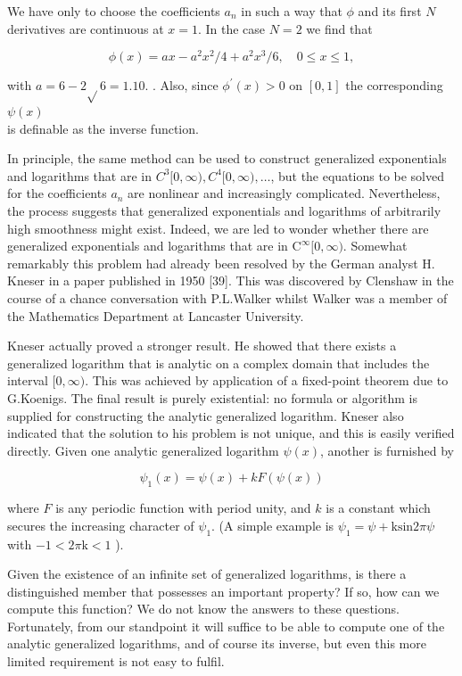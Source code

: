 \documentclass[10pt]{article}
\begin{document}
We have only to choose the coefficients $a_{n}$ in such a way that $\phi$ and its first $N$ derivatives are continuous at $x=1$. In the case $N=2$ we find that

$$
\phi(x)=a x-a^{2} x^{2} / 4+a^{2} x^{3} / 6, \quad 0 \leqslant x \leqslant 1,
$$

with $a=6-2 \sqrt{ } 6=1.10$. . Also, since $\phi^{\prime}(x)>0$ on $[0,1]$ the corresponding $\psi(x)$\\
is definable as the inverse function.

In principle, the same method can be used to construct generalized exponentials and logarithms that are in $C^{3}[0, \infty), C^{4}[0, \infty), \ldots$, but the equations to be solved for the coefficients $a_{n}$ are nonlinear and increasingly complicated. Nevertheless, the process suggests that generalized exponentials and logarithms of arbitrarily high smoothness might exist. Indeed, we are led to wonder whether there are generalized exponentials and logarithms that are in $\mathrm{C}^{\infty}[0, \infty)$. Somewhat remarkably this problem had already been resolved by the German analyst H. Kneser in a paper published in 1950 [39]. This was discovered by Clenshaw in the course of a chance conversation with P.L.Walker whilst Walker was a member of the Mathematics Department at Lancaster University.

Kneser actually proved a stronger result. He showed that there exists a generalized logarithm that is analytic on a complex domain that includes the interval $[0, \infty)$. This was achieved by application of a fixed-point theorem due to G.Koenigs. The final result is purely existential: no formula or algorithm is supplied for constructing the analytic generalized logarithm. Kneser also indicated that the solution to his problem is not unique, and this is easily verified directly. Given one analytic generalized logarithm $\psi(x)$, another is furnished by

$$
\psi_{1}(x)=\psi(x)+k F(\psi(x))
$$

where $F$ is any periodic function with period unity, and $k$ is a constant which secures the increasing character of $\psi_{1}$. (A simple example is $\psi_{1}=\psi+\mathrm{ksin} 2 \pi \psi$ with $-1<2 \pi \mathrm{k}<1$ ).

Given the existence of an infinite set of generalized logarithms, is there a distinguished member that possesses an important property? If so, how can we compute this function? We do not know the answers to these questions. Fortunately, from our standpoint it will suffice to be able to compute one of the analytic generalized logarithms, and of course its inverse, but even this more limited requirement is not easy to fulfil.
\end{document}
